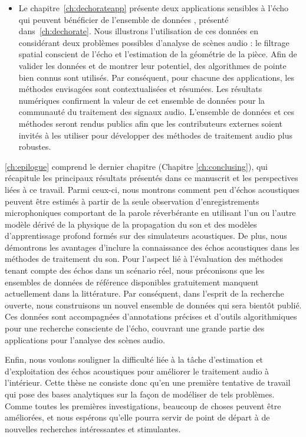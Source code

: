 \begin{itemize}
    \item
    Le chapitre~\ref{ch:dechorateapp} présente deux applications sensibles à l'écho qui peuvent bénéficier de l'ensemble de données \dEchorate, présenté dans~\ref{ch:dechorate}. Nous illustrons l'utilisation de ces données en considérant deux problèmes possibles d'analyse de scènes audio : le filtrage spatial conscient de l'écho et l'estimation de la géométrie de la pièce.
    Afin de valider les données et de montrer leur potentiel, des algorithmes de pointe bien connus sont utilisés. Par conséquent, pour chacune des applications, les méthodes envisagées sont contextualisées et résumées.
    Les résultats numériques confirment la valeur de cet ensemble de données pour la communauté du traitement des signaux audio. L'ensemble de données et ces méthodes seront rendus publics afin que les contributeurs externes soient invités à les utiliser pour développer des méthodes de traitement audio plus robustes.
\end{itemize}

\ref{ch:epilogue} comprend le dernier chapitre (Chapitre \ref{ch:conclusing}), qui récapitule les principaux résultats présentés dans ce manuscrit et les perspectives liées à ce travail.
Parmi ceux-ci, nous montrons comment peu d'échos acoustiques peuvent être estimés à partir de la seule observation d'enregistrements microphoniques comportant de la parole réverbérante en utilisant l'un ou l'autre modèle dérivé de la physique de la propagation du son et des modèles d'apprentissage profond formés sur des simulateurs acoustiques.
De plus, nous démontrons les avantages d'inclure la connaissance des échos acoustiques dans les méthodes de traitement du son.
Pour l'aspect lié à l'évaluation des méthodes tenant compte des échos dans un scénario réel, nous préconisons que les ensembles de données de référence disponibles gratuitement manquent actuellement dans la littérature. Par conséquent, dans l'esprit de la recherche ouverte, nous construisons un nouvel ensemble de données qui sera bientôt publié. Ces données sont accompagnées d'annotations précises et d'outils algorithmiques pour une recherche consciente de l'écho, couvrant une grande partie des applications pour l'analyse des scènes audio.

\mynewline
Enfin, nous voulons souligner la difficulté liée à la tâche d'estimation et d'exploitation des échos acoustiques pour améliorer le traitement audio à l'intérieur. Cette thèse ne consiste donc qu'en une première tentative de travail qui pose des bases analytiques sur la façon de modéliser de tels problèmes.
Comme toutes les premières investigations, beaucoup de choses peuvent être améliorées, et nous espérons qu'elle pourra servir de point de départ à de nouvelles recherches intéressantes et stimulantes.